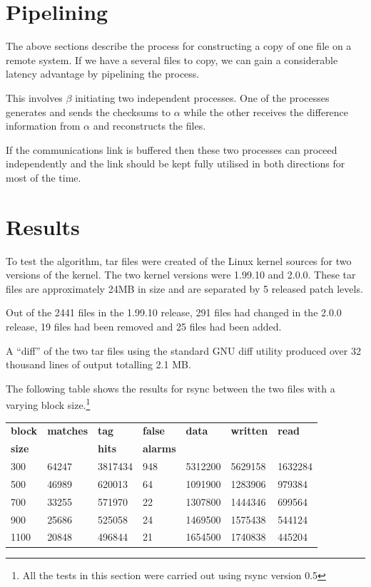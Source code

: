 \documentclass[a4paper]{article}
\begin{document}
\section{Pipelining}

The above sections describe the process for constructing a copy of one
file on a remote system.  If we have a several files to copy, we can
gain a considerable latency advantage by pipelining the process.

This involves $\beta$ initiating two independent processes. One of the
processes generates and sends the checksums to $\alpha$ while the
other receives the difference information from $\alpha$ and
reconstructs the files.

If the communications link is buffered then these two processes can
proceed independently and the link should be kept fully utilised in
both directions for most of the time.

\section{Results}

To test the algorithm, tar files were created of the Linux kernel
sources for two versions of the kernel. The two kernel versions were
1.99.10 and 2.0.0. These tar files are approximately 24MB in size and
are separated by 5 released patch levels.

Out of the 2441 files in the 1.99.10 release, 291 files had changed in
the 2.0.0 release, 19 files had been removed and 25 files had been
added.

A ``diff'' of the two tar files using the standard GNU diff utility
produced over 32 thousand lines of output totalling 2.1 MB.

The following table shows the results for rsync between the two files
with a varying block size.\footnote{All the tests in this section were
  carried out using rsync version 0.5}

\vspace*{5mm}
\begin{tabular}{|l|l|l|l|l|l|l|} \hline
{\bf block} & {\bf matches} & {\bf tag}  & {\bf false}  & {\bf data} & {\bf written}  & {\bf read} \\
{\bf size}  &               & {\bf hits} & {\bf alarms} &            &                &            \\ \hline \hline

300         & 64247         & 3817434    & 948          & 5312200    & 5629158        & 1632284   \\ \hline
500         & 46989         & 620013     & 64           & 1091900    & 1283906        & 979384    \\ \hline
700         & 33255         & 571970     & 22           & 1307800    & 1444346        & 699564    \\ \hline
900         & 25686         & 525058     & 24           & 1469500    & 1575438        & 544124    \\ \hline
1100        & 20848         & 496844     & 21           & 1654500    & 1740838        & 445204    \\ \hline
\end{tabular}
\vspace*{5mm}
\end{document}
